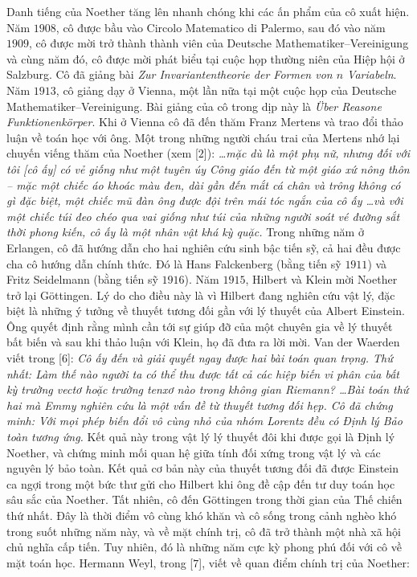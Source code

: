 \begin{multicols}{2}
	\vskip 0.05cm
	Danh tiếng của Noether tăng lên nhanh chóng khi các ấn phẩm của cô xuất hiện. Năm $1908$, cô được bầu vào Circolo Matematico di Palermo, sau đó vào năm $1909$, cô được mời trở thành thành viên của Deutsche Mathematiker--Vereinigung và cùng năm đó, cô được mời phát biểu tại cuộc họp thường niên của Hiệp hội ở Salzburg. Cô đã giảng bài \textit{Zur Invariantentheorie der Formen von $n$ Variabeln}. Năm $1913$, cô giảng dạy ở Vienna, một lần nữa tại một cuộc họp của Deutsche Mathematiker--Vereinigung. Bài giảng của cô trong dịp này là \textit{Über Reasone Funktionenkörper}. Khi ở Vienna cô đã đến thăm Franz Mertens và trao đổi thảo luận về toán học với ông. Một trong những người cháu trai của Mertens nhớ lại chuyến viếng thăm của Noether (xem [$2$]):
	\vskip 0.05cm
	\textit{\ldots mặc dù là một phụ nữ, nhưng đối với tôi [cô ấy] có vẻ giống như một tuyên úy Công giáo đến từ một giáo xứ nông thôn -- mặc một chiếc áo khoác màu đen, dài gần đến mắt cá chân và trông không có gì đặc biệt, một chiếc mũ đàn ông được đội trên mái tóc ngắn của cô ấy \ldots và với một chiếc túi đeo chéo qua vai giống như túi của những người soát vé đường sắt thời phong kiến, cô ấy là một nhân vật khá kỳ quặc.}
	\vskip 0.05cm
	Trong những năm ở Erlangen, cô đã hướng dẫn cho hai nghiên cứu sinh bậc tiến sỹ, cả hai đều được cha cô hướng dẫn chính thức. Đó là Hans Falckenberg (bằng tiến sỹ $1911$) và Fritz Seidelmann (bằng tiến sỹ $1916$).
	\vskip 0.05cm
	Năm $1915$, Hilbert và Klein mời Noether trở lại Göttingen. Lý do cho điều này là vì Hilbert đang nghiên cứu vật lý, đặc biệt là những ý tưởng về thuyết tương đối gần với lý thuyết của Albert Einstein. Ông quyết định rằng mình cần tới sự giúp đỡ của một chuyên gia về lý thuyết bất biến và sau khi thảo luận với Klein, họ đã đưa ra lời mời. Van der Waerden viết trong [$6$]:
	\vskip 0.05cm
	\textit{Cô ấy đến và giải quyết ngay được hai bài toán quan trọng. Thứ nhất: Làm thế nào người ta có thể thu được tất cả các hiệp biến vi phân của bất kỳ trường vectơ hoặc trường tenxơ nào trong không gian Riemann? \ldots Bài toán thứ hai mà Emmy nghiên cứu là một vấn đề từ thuyết tương đối hẹp. Cô đã chứng minh: Với mọi phép biến đổi vô cùng nhỏ của nhóm Lorentz đều có Định lý Bảo toàn tương ứng.}
	\vskip 0.05cm
	Kết quả này trong vật lý lý thuyết đôi khi được gọi là Định lý Noether, và chứng minh mối quan hệ giữa tính đối xứng trong vật lý và các nguyên lý bảo toàn. Kết quả cơ bản này của thuyết tương đối đã được Einstein ca ngợi trong một bức thư gửi cho Hilbert khi ông đề cập đến tư duy toán học sâu sắc của Noether. Tất nhiên, cô  đến Göttingen trong thời gian của Thế chiến thứ nhất. Đây là thời điểm vô cùng khó khăn và cô  sống trong cảnh nghèo khó trong suốt những năm này, và về mặt chính trị, cô  đã trở thành một nhà xã hội chủ nghĩa cấp tiến. Tuy nhiên, đó là những năm cực kỳ phong phú đối với cô về mặt toán học. Hermann Weyl, trong [$7$], viết về quan điểm chính trị của Noether:

\end{multicols}
